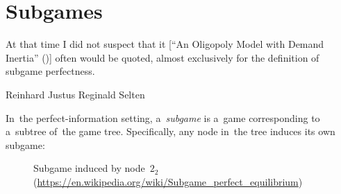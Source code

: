 
\section{Subgames}
\epigraph{
  At that time I did not suspect that it [``An Oligopoly Model with Demand Inertia'' (\cite{Selten1968oligopoly})] often would be quoted, almost exclusively for the definition of subgame perfectness.
}{Reinhard Justus Reginald Selten}
In~the perfect-information setting, a~\emph{subgame} is a~game corresponding to a~subtree of~the game tree.
Specifically, any node in~the tree induces its own subgame:
\begin{figure}[H]
  \centering
  \scriptsize
  \def\svgwidth{.7\textwidth}
  
  \def\captionTitle{Subgame induced by node~$2_2$}
  \caption[\captionTitle]{\captionTitle{}\\ (\href{https://en.wikipedia.org/wiki/Subgame_perfect_equilibrium}{https://en.wikipedia.org/wiki/Subgame\_perfect\_equilibrium})}
  \label{fig:ext-form-subgame}
\end{figure}

